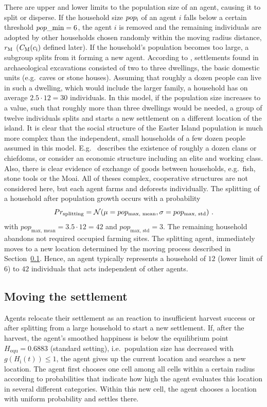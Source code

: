 There are upper and lower limits to the population size of an agent, causing it to split or disperse.
If the household size $pop_{\rm i}$ of an agent $i$ falls below a certain threshold $pop\_{\rm min} = 6$, the agent $i$ is removed and the remaining individuals are adopted by other households chosen randomly within the moving radius distance, $r_{\rm M}$ ($C_{\rm M}(c_{\rm i})$ defined later).
If the household's population becomes too large, a subgroup splits from it forming a new agent.
According to \citet{Bahn2017}, settlements found in archaeological excavations consisted of two to three dwellings, the basic domestic units (e.g.\ caves or stone houses). 
Assuming that roughly a dozen people can live in such a dwelling, which would include the larger family, a household has on average $2.5\cdot 12 = 30$ individuals.
In this model, if the population size increases to a value, such that roughly more than three dwellings would be needed, a group of twelve individuals splits and starts a new settlement on a different location of the island. 
It is clear that the social structure of the Easter Island population is much more complex than the independent, small households of a few dozen people assumed in this model. 
E.g.\ \citet{Diamond2011} describes the existence of roughly a dozen clans or chiefdoms, or \citet{Puleston2017} consider an economic structure including an elite and working class.
Also, there is clear evidence of exchange of goods between households, e.g.\ fish, stone tools or the Moai.
All of theses complex, cooperative structures are not considered here, but each agent farms and deforests individually.
The splitting of a household after population growth occurs with a probability 
\begin{equation}
Pr_{\rm splitting} = \mathcal{N}( \mu = pop_\text{max, mean}, \sigma = pop_\text{max, std})\ .
\end{equation}
with $pop_\text{max, mean} = 3.5 \cdot 12 = 42$ and $pop_\text{max, std} = 3$.
The remaining household abandons not required occupied farming sites.
The splitting agent, immediately moves to a new location determined by the moving process described in Section~\ref{sec:Moving}.
Hence, an agent typically represents a household of $12$ (lower limit of $6$) to $42$ individuals that acts independent of other agents.

\subsection{Moving the settlement}\label{sec:Moving}
Agents relocate their settlement as an reaction to insufficient harvest success or after splitting from a large household to start a new settlement.
If, after the harvest, the agent's smoothed happiness is below the equilibrium point $H_\text{equ}=0.6883$ (standard setting), i.e.\ population size has decreased with $g(H_\text{i}(t))\leq 1$, the agent gives up the current location and searches a new location.
The agent first chooses one cell among all cells within a certain radius according to probabilities that indicate how high the agent evaluates this location in several different categories.
Within this new cell, the agent chooses a location with uniform probability and settles there.

